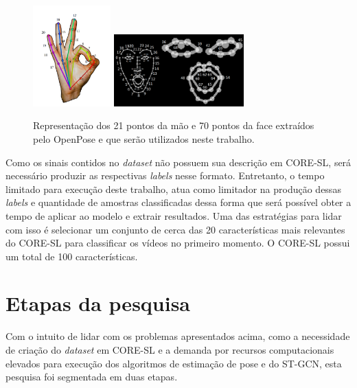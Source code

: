 \begin{figure}[ht]
    \centering
    \includegraphics[width=3cm]{images/keypoints_hand}
    \includegraphics[width=5cm]{images/keypoints_face}
    \caption{Representação dos 21 pontos da mão e 70 pontos da face extraídos pelo OpenPose e que serão utilizados neste trabalho.}
    \label{fig:keypoints-face-hand}
\end{figure}
Como os sinais contidos no \textit{dataset} não possuem sua descrição em CORE-SL, será necessário produzir as respectivas \textit{labels} nesse formato. Entretanto, o tempo limitado para execução deste trabalho, atua como limitador na produção dessas \textit{labels} e quantidade de amostras classificadas dessa forma que será possível obter a tempo de aplicar ao modelo e extrair resultados. Uma das estratégias para lidar com isso é selecionar um conjunto de cerca das 20 características mais relevantes do CORE-SL para classificar os vídeos no primeiro momento. O CORE-SL possui um total de 100 características.


\section{Etapas da pesquisa} %
Com o intuito de lidar com os problemas apresentados acima, como a necessidade de criação do  \textit{dataset} em CORE-SL e a demanda por recursos computacionais elevados para execução dos algoritmos de estimação de pose e do ST-GCN, esta pesquisa foi segmentada em duas etapas. 

